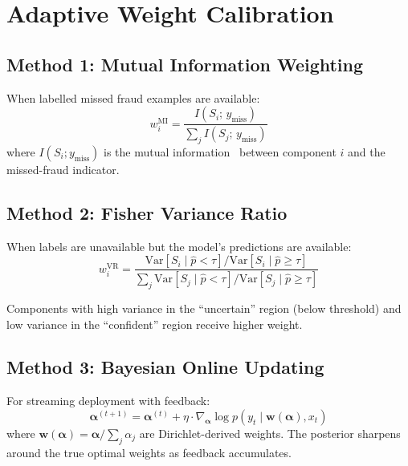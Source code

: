 \documentclass[journal]{IEEEtran}
\begin{document}
\section{Adaptive Weight Calibration}
\label{sec:adaptive}

\subsection{Method 1: Mutual Information Weighting}
\label{ssec:mi}

When labelled missed fraud examples are available:
\begin{equation}
  w_i^{\text{MI}} = \frac{I(S_i;\, y_{\text{miss}})}{\sum_j I(S_j;\, y_{\text{miss}})}
  \label{eq:mi_weight}
\end{equation}
where $I(S_i; y_{\text{miss}})$ is the mutual information~\cite{cover2006} between component $i$ and the missed-fraud indicator.

\subsection{Method 2: Fisher Variance Ratio}
\label{ssec:fisher}

When labels are unavailable but the model's predictions are available:
\begin{equation}
  w_i^{\text{VR}} = \frac{\text{Var}[S_i \mid \hat{p} < \tau] / \text{Var}[S_i \mid \hat{p} \geq \tau]}{\sum_j \text{Var}[S_j \mid \hat{p} < \tau] / \text{Var}[S_j \mid \hat{p} \geq \tau]}
  \label{eq:vr_weight}
\end{equation}

Components with high variance in the ``uncertain'' region (below threshold) and low variance in the ``confident'' region receive higher weight.

\subsection{Method 3: Bayesian Online Updating}
\label{ssec:bayesian}

For streaming deployment with feedback:
\begin{equation}
  \bm{\alpha}^{(t+1)} = \bm{\alpha}^{(t)} + \eta \cdot \nabla_{\bm{\alpha}} \log p(y_t \mid \bm{w}(\bm{\alpha}), x_t)
  \label{eq:bayesian}
\end{equation}
where $\bm{w}(\bm{\alpha}) = \bm{\alpha}/\sum_j \alpha_j$ are Dirichlet-derived weights. The posterior sharpens around the true optimal weights as feedback accumulates.
\end{document}
